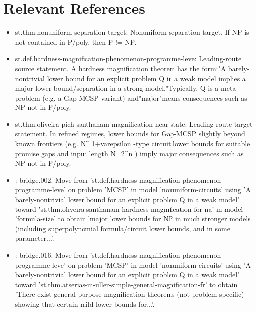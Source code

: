 \documentclass[11pt]{article}
\begin{document}
\section{Relevant References}
\begin{itemize}[leftmargin=*,itemsep=0.2em]
\item [Grounding implication] st.thm.nonuniform-separation-target: Nonuniform separation target. If NP is not contained in P/poly, then P != NP.
\item [Leading-route source] st.def.hardness-magnification-phenomenon-programme-leve: Leading-route source statement. A hardness magnification theorem has the form:"A barely-nontrivial lower bound for an explicit problem Q in a weak model implies a major lower bound/separation in a strong model."Typically, Q is a meta-problem (e.g. a Gap-MCSP variant) and"major"means consequences such as NP not in P/poly.
\item [Leading-route target] st.thm.oliveira-pich-santhanam-magnification-near-state: Leading-route target statement. In refined regimes, lower bounds for Gap-MCSP slightly beyond known frontiers (e.g. N\textasciicircum{} 1+varepsilon -type circuit lower bounds for suitable promise gaps and input length N=2\textasciicircum{}n ) imply major consequences such as NP not in P/poly.
\item [Fallback-route target] : bridge.002. Move from 'st.def.hardness-magnification-phenomenon-programme-leve' on problem 'MCSP' in model 'nonuniform-circuits' using 'A barely-nontrivial lower bound for an explicit problem Q in a weak model' toward 'st.thm.oliveira-santhanam-hardness-magnification-for-na' in model 'formula-size' to obtain 'major lower bounds for NP in much stronger models (including superpolynomial formula/circuit lower bounds, and in some parameter...'.
\item [Fallback-route target] : bridge.016. Move from 'st.def.hardness-magnification-phenomenon-programme-leve' on problem 'MCSP' in model 'nonuniform-circuits' using 'A barely-nontrivial lower bound for an explicit problem Q in a weak model' toward 'st.thm.atserias-m-uller-simple-general-magnification-fr' to obtain 'There exist general-purpose magnification theorems (not problem-specific) showing that certain mild lower bounds for...'.
\end{itemize}
\end{document}
